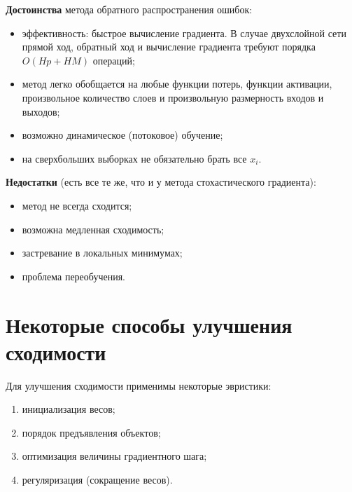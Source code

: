 \documentclass[specialist, 12pt, 
subf, %
href, colorlinks=true,
substylefile = spbu.rtx,
]{disser}
\begin{document}
\textbf{Достоинства} метода обратного распространения ошибок:
\begin{itemize}
	\item эффективность: быстрое вычисление градиента. В случае двухслойной сети прямой ход, обратный ход и вычисление градиента требуют порядка $O(Hp+HM)$ операций;
	\item метод легко обобщается на любые функции потерь, функции активации, произвольное количество слоев и произвольную размерность входов и выходов;
	\item возможно динамическое (потоковое) обучение;
	\item на сверхбольших выборках не обязательно брать все $x_i$.
\end{itemize}

\textbf{Недостатки} (есть все те же, что и у метода стохастического градиента):
\begin{itemize}
	\item метод не всегда сходится;
	\item возможна медленная сходимость;
	\item застревание в локальных минимумах;
	\item проблема переобучения.
\end{itemize}

\section{Некоторые способы улучшения сходимости}

Для улучшения сходимости применимы некоторые эвристики:
	\begin{enumerate}
	\item инициализация весов;
	\item порядок предъявления объектов;
	\item оптимизация величины градиентного шага;
	\item регуляризация (сокращение весов). 
\end{enumerate} 
\end{document}
